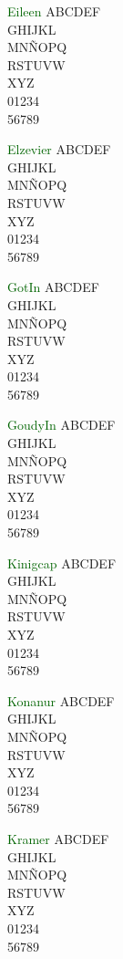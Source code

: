 \documentclass[11pt]{article}
\newcommand{\blInitSz}{20}
\begin{document}
\textcolor{darkgreen}{Eileen}
{\blSetEileen\fontsize{\blInitSz}{40}\selectfont ABCDEF\\ GHIJKL\\ MNÑOPQ\\ RSTUVW\\ XYZ\\ 01234\\ 56789}

\textcolor{darkgreen}{Elzevier}
{\blSetElzevier\fontsize{\blInitSz}{40}\selectfont ABCDEF\\ GHIJKL\\ MNÑOPQ\\ RSTUVW\\ XYZ\\ 01234\\ 56789}

\textcolor{darkgreen}{GotIn}
{\blSetGotIn\fontsize{\blInitSz}{40}\selectfont ABCDEF\\ GHIJKL\\ MNÑOPQ\\ RSTUVW\\ XYZ\\ 01234\\ 56789}

\textcolor{darkgreen}{GoudyIn}
{\blSetGoudyIn\fontsize{\blInitSz}{40}\selectfont ABCDEF\\ GHIJKL\\ MNÑOPQ\\ RSTUVW\\ XYZ\\ 01234\\ 56789}

\textcolor{darkgreen}{Kinigcap}
{\blSetKinigcap\fontsize{\blInitSz}{40}\selectfont ABCDEF\\ GHIJKL\\ MNÑOPQ\\ RSTUVW\\ XYZ\\ 01234\\ 56789}

\textcolor{darkgreen}{Konanur}
{\blSetKonanur\fontsize{\blInitSz}{40}\selectfont ABCDEF\\ GHIJKL\\ MNÑOPQ\\ RSTUVW\\ XYZ\\ 01234\\ 56789}

\textcolor{darkgreen}{Kramer}
{\blSetKramer\fontsize{\blInitSz}{40}\selectfont ABCDEF\\ GHIJKL\\ MNÑOPQ\\ RSTUVW\\ XYZ\\ 01234\\ 56789}
\end{document}
